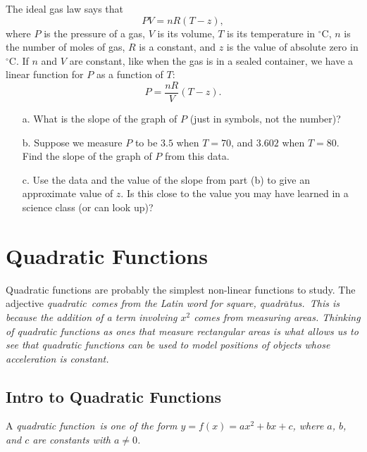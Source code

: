 \begin{question} The ideal gas law says that
\[
PV = nR(T-z),
\]
where $P$ is the pressure of a gas, $V$ is its volume, $T$ is its temperature in $^{\circ}$C, $n$ is the number of moles of gas, $R$ is a constant, and $z$ is the value of absolute zero in $^{\circ}$C. If $n$ and $V$ are constant, like when the gas is in a sealed container, we have a linear function for $P$ as a function of $T$:
\[
P = \frac{nR}{V} (T-z).
\]
\begin{enumerate} 
\item[a.] What is the slope of the graph of $P$ (just in symbols, not the number)?
\item[b.] Suppose we measure $P$ to be $3.5$ when $T = 70$, and $3.602$ when $T = 80$. Find the slope of the graph of $P$ from this data.
\item[c.] Use the data and the value of the slope from part (b) to give an approximate value of $z$. Is this close to the value you may have learned in a science class (or can look up)? 
\end{enumerate} 
\end{question}

\vfill


\pagebreak

\section{Quadratic Functions}

Quadratic functions are probably the simplest non-linear functions to study. The adjective \it{quadratic}\ \normalfont comes from the Latin word for square, \it{quadr$\overline{a}$tus}.\ \normalfont This is because the addition of a term involving $x^2$ comes from measuring areas. Thinking of quadratic functions as ones that measure rectangular areas is what allows us to see that quadratic functions can be used to model positions of objects whose acceleration is constant.  

\subsection{Intro to Quadratic Functions}

A \it{quadratic function}\ \normalfont is one of the form $y = f(x) = ax^2+bx+c$, where $a$, $b$, and $c$ are constants with $a\neq 0$.

\par

